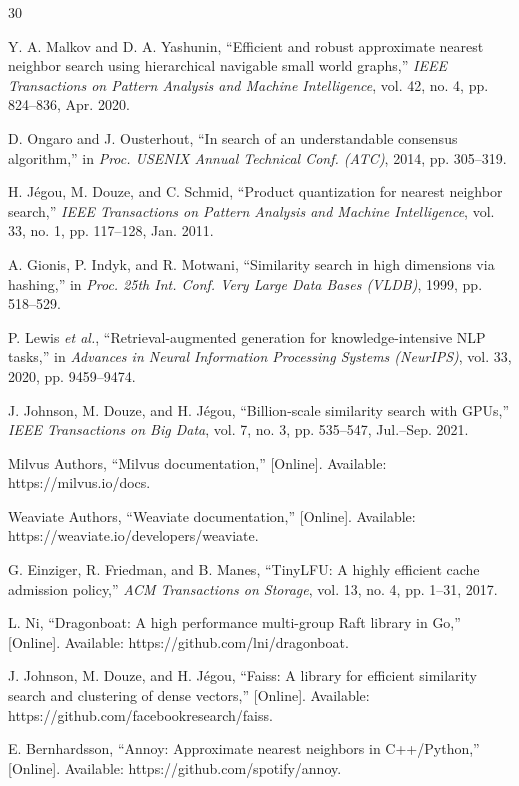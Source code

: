 \documentclass[conference]{IEEEtran}
\begin{document}
\begin{thebibliography}{30}

 Y. A. Malkov and D. A. Yashunin, ``Efficient and robust approximate nearest neighbor search using hierarchical navigable small world graphs,'' \emph{IEEE Transactions on Pattern Analysis and Machine Intelligence}, vol. 42, no. 4, pp. 824--836, Apr. 2020.

 D. Ongaro and J. Ousterhout, ``In search of an understandable consensus algorithm,'' in \emph{Proc. USENIX Annual Technical Conf. (ATC)}, 2014, pp. 305--319.

 H. J\'egou, M. Douze, and C. Schmid, ``Product quantization for nearest neighbor search,'' \emph{IEEE Transactions on Pattern Analysis and Machine Intelligence}, vol. 33, no. 1, pp. 117--128, Jan. 2011.

 A. Gionis, P. Indyk, and R. Motwani, ``Similarity search in high dimensions via hashing,'' in \emph{Proc. 25th Int. Conf. Very Large Data Bases (VLDB)}, 1999, pp. 518--529.

 P. Lewis \emph{et al.}, ``Retrieval-augmented generation for knowledge-intensive NLP tasks,'' in \emph{Advances in Neural Information Processing Systems (NeurIPS)}, vol. 33, 2020, pp. 9459--9474.

 J. Johnson, M. Douze, and H. J\'egou, ``Billion-scale similarity search with GPUs,'' \emph{IEEE Transactions on Big Data}, vol. 7, no. 3, pp. 535--547, Jul.--Sep. 2021.

 Milvus Authors, ``Milvus documentation,'' [Online]. Available: https://milvus.io/docs.

 Weaviate Authors, ``Weaviate documentation,'' [Online]. Available: https://weaviate.io/developers/weaviate.

 G. Einziger, R. Friedman, and B. Manes, ``TinyLFU: A highly efficient cache admission policy,'' \emph{ACM Transactions on Storage}, vol. 13, no. 4, pp. 1--31, 2017.

 L. Ni, ``Dragonboat: A high performance multi-group Raft library in Go,'' [Online]. Available: https://github.com/lni/dragonboat.

 J. Johnson, M. Douze, and H. J\'egou, ``Faiss: A library for efficient similarity search and clustering of dense vectors,'' [Online]. Available: https://github.com/facebookresearch/faiss.

 E. Bernhardsson, ``Annoy: Approximate nearest neighbors in C++/Python,'' [Online]. Available: https://github.com/spotify/annoy.


\end{thebibliography}
\end{document}
